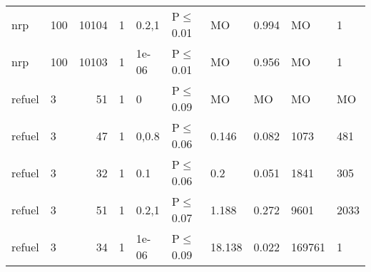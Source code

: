 \begin{longtable}{llrrllllll}
 nrp           & 100      &  	10104 & 1 & 0.2,1 & P$\leq$0.01  & MO       & 0.994    & MO      & 1       \\
 nrp           & 100      &  	10103 & 1 & 1e-06 & P$\leq$0.01  & MO       & 0.956    & MO      & 1       \\
 refuel        & 3        &     	51 & 1 & 0     & P$\leq$0.09  & MO       & MO       & MO      & MO      \\
 refuel        & 3        &     	47 & 1 & 0,0.8 & P$\leq$0.06  & 0.146    & 0.082    & 1073    & 481     \\
 refuel        & 3        &     	32 & 1 & 0.1   & P$\leq$0.06  & 0.2      & 0.051    & 1841    & 305     \\
 refuel        & 3        &     	51 & 1 & 0.2,1 & P$\leq$0.07  & 1.188    & 0.272    & 9601    & 2033    \\
 refuel        & 3        &     	34 & 1 & 1e-06 & P$\leq$0.09  & 18.138   & 0.022    & 169761  & 1       \\
\bottomrule
\end{longtable}

